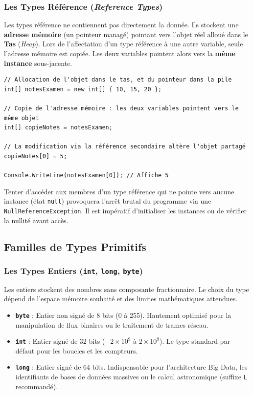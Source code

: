 \subsubsection{Les Types Référence (\emph{Reference Types})}
Les types référence ne contiennent pas directement la donnée. Ils stockent une \textbf{adresse mémoire} (un pointeur managé) pointant vers l'objet réel alloué dans le \textbf{Tas} (\emph{Heap}). 
Lors de l'affectation d'un type référence à une autre variable, seule l'adresse mémoire est copiée. Les deux variables pointent alors vers la \textbf{même instance} sous-jacente.

\begin{lstlisting}[caption={Comportement en mémoire des types référence (tas)}]
// Allocation de l'objet dans le tas, et du pointeur dans la pile
int[] notesExamen = new int[] { 10, 15, 20 };

// Copie de l'adresse mémoire : les deux variables pointent vers le même objet
int[] copieNotes = notesExamen;

// La modification via la référence secondaire altère l'objet partagé
copieNotes[0] = 5;

Console.WriteLine(notesExamen[0]); // Affiche 5
\end{lstlisting}

\begin{tcolorbox}[colback=backcolour,colframe=stringcolor,title=\textbf{Piège de l'ingénierie : L'Exception de Référence Nulle}]
    Tenter d'accéder aux membres d'un type référence qui ne pointe vers aucune instance (état \texttt{null}) provoquera l'arrêt brutal du programme via une \texttt{NullReferenceException}. Il est impératif d'initialiser les instances ou de vérifier la nullité avant accès.
\end{tcolorbox}

\subsection{Familles de Types Primitifs}

\subsubsection{Les Types Entiers (\texttt{int}, \texttt{long}, \texttt{byte})}
Les entiers stockent des nombres sans composante fractionnaire. Le choix du type dépend de l'espace mémoire souhaité et des limites mathématiques attendues.

\begin{itemize}
    \item \textbf{\texttt{byte}} : Entier non signé de 8 bits (0 à 255). Hautement optimisé pour la manipulation de flux binaires ou le traitement de trames réseau.
    \item \textbf{\texttt{int}} : Entier signé de 32 bits ($-2 \times 10^9$ à $2 \times 10^9$). Le type standard par défaut pour les boucles et les compteurs.
    \item \textbf{\texttt{long}} : Entier signé de 64 bits. Indispensable pour l'architecture Big Data, les identifiants de bases de données massives ou le calcul astronomique (suffixe \texttt{L} recommandé).
\end{itemize}

